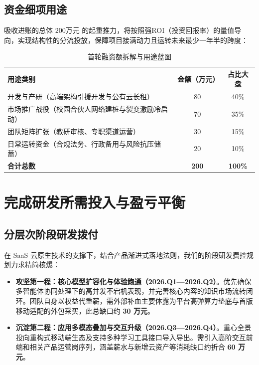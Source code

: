 \subsection{资金细项用途}
吸收进账的总体 200万元 的起重推力，将按照强ROI（投资回报率）的量值导向，实现结构性的分流投放，保障项目接满动力且运转未来最少一年半的跨度：
\begin{table}[htbp]
  \centering
  \small
  \caption{首轮融资额拆解与用途蓝图}
  \begin{tabular}{p{}cc}
    \toprule
    \textbf{用途类别} & \textbf{金额（万元）} & \textbf{占比大盘} \\
    \midrule
    开发与产研（高端架构引援开发与公有云长租） & 80 & 40\% \\
    市场推广战役（校园合伙人网络建桩与裂变激励冷启动） & 70 & 35\% \\
    团队矩阵扩张（教研审核、专职渠道运营） & 30 & 15\% \\
    日常运转资金（合规法务、行政备用与风险抗压储蓄） & 20 & 10\% \\
    \midrule
    \textbf{合计总数} & \textbf{200} & \textbf{100\%} \\
    \bottomrule
  \end{tabular}
\end{table}

\section{完成研发所需投入与盈亏平衡}

\subsection{分层次阶段研发拨付}
在 SaaS 云原生技术的支撑下，结合产品渐进式落地法则，我们的阶段研发费控规划力求精简核爆：
\begin{itemize}
    \item \textbf{攻坚第一程：核心模型扩容化与体验跑通（2026.Q1—2026.Q2）}。优先确保多智能体协同处理下的高并发不宕机表现，并完善核心内容的知识市场流转闭环。团队自身以权益代重薪，需外部补血主要体露为平台高弹算力垫底与首版移动适配的外包采买，此总缺口约 \textbf{30 万元}。
    \item \textbf{沉淀第二程：应用多模态叠加与交互升级（2026.Q3—2026.Q4）}。重心全景投向重构式移动端生态及支持多种学习工具接口导入导出。需引入高阶交互前端和相关产品运营岗序列，涵盖薪水与新增云资产等消耗缺口约折合 \textbf{60 万元}。
\end{itemize}

